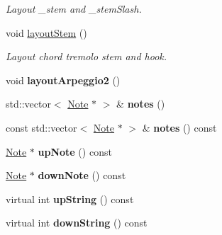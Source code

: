 \begin{DoxyCompactItemize}
\begin{DoxyCompactList}\small\item\em Layout \+\_\+stem and \+\_\+stem\+Slash. \end{DoxyCompactList}\item 
\mbox{\label{class_ms_1_1_chord_a8a5728af14a2e7b599dabe6df851858d}} 
void \hyperlink{class_ms_1_1_chord_a8a5728af14a2e7b599dabe6df851858d}{layout\+Stem} ()
\begin{DoxyCompactList}\small\item\em Layout chord tremolo stem and hook. \end{DoxyCompactList}\item 
\mbox{\label{class_ms_1_1_chord_a83b52654e7177b6ab649f8da843f28a5}} 
void {\bfseries layout\+Arpeggio2} ()
\item 
\mbox{\label{class_ms_1_1_chord_a77eab400665dc934f24de11fc7ac1c4e}} 
std\+::vector$<$ \hyperlink{class_ms_1_1_note}{Note} $\ast$ $>$ \& {\bfseries notes} ()
\item 
\mbox{\label{class_ms_1_1_chord_a21007e7098e9dbb2b9ad24df98806dcb}} 
const std\+::vector$<$ \hyperlink{class_ms_1_1_note}{Note} $\ast$ $>$ \& {\bfseries notes} () const
\item 
\mbox{\label{class_ms_1_1_chord_a1a35e7598d783204faa93ba261b5909d}} 
\hyperlink{class_ms_1_1_note}{Note} $\ast$ {\bfseries up\+Note} () const
\item 
\mbox{\label{class_ms_1_1_chord_a34bb3c54117e0a1b7ca0c632c19a0bd7}} 
\hyperlink{class_ms_1_1_note}{Note} $\ast$ {\bfseries down\+Note} () const
\item 
\mbox{\label{class_ms_1_1_chord_aa7666a2f4db2c35a828a90a013fbadc6}} 
virtual int {\bfseries up\+String} () const
\item 
\mbox{\label{class_ms_1_1_chord_aaf9bb50408c17fa91c3b1f199bd6a77a}} 
virtual int {\bfseries down\+String} () const
\item 
\mbox{\label{class_ms_1_1_chord_af47aefd8b662abf70a13344dc31bad07}} 

\end{DoxyCompactItemize}
